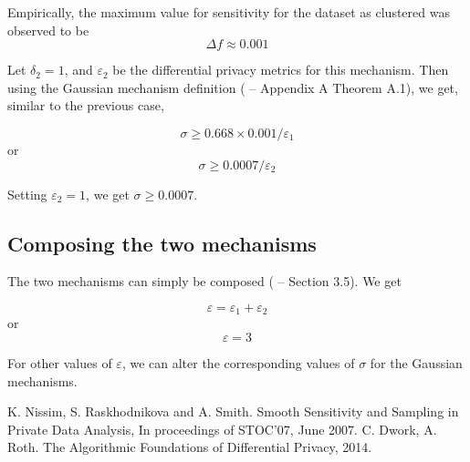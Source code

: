 \documentclass[]{article}
\begin{document}
Empirically, the maximum value for sensitivity for the dataset as clustered was observed to be 
\[\Delta f \approx 0.001\]

Let $\delta_2 = 1$, and $\varepsilon_2$ be the differential privacy metrics for this mechanism. Then using the Gaussian mechanism definition (\cite{diffp} -- Appendix A Theorem A.1), we get, similar to the previous case,

\[\sigma \geq 0.668\times 0.001/\varepsilon_1\]
or \[\sigma \geq 0.0007/\varepsilon_{2}\]

Setting $\varepsilon_2 = 1$, we get $\sigma \geq 0.0007$.

\subsection{Composing the two mechanisms}

The two mechanisms can simply be composed (\cite{diffp} -- Section 3.5). We get

\[\varepsilon = \varepsilon_1 + \varepsilon_2\]
or \[\varepsilon = 3\]

For other values of $\varepsilon$, we can alter the corresponding values of $\sigma$ for the Gaussian mechanisms.

\begin{thebibliography}{1}
     K. Nissim, S. Raskhodnikova and A. Smith. Smooth Sensitivity and Sampling in Private Data Analysis, In proceedings of STOC'07, June 2007.
     C. Dwork, A. Roth. The Algorithmic Foundations of Differential Privacy, 2014.
\end{thebibliography}
\end{document}
